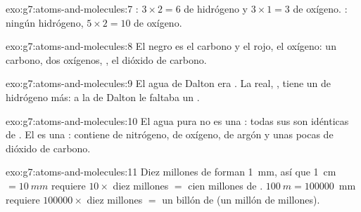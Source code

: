 \begin{solution}{exo:g7:atoms-and-molecules:7}
: $3\times 2 = 6$  de hidrógeno y $3\times 1 = 3$ 
de oxígeno. : ningún hidrógeno, $5\times 2 = 10$  de
oxígeno.
\end{solution}

\begin{solution}{exo:g7:atoms-and-molecules:8}
El negro es el carbono y el rojo, el oxígeno: un carbono, dos oxígenos,
, el dióxido de carbono.
\end{solution}

\begin{solution}{exo:g7:atoms-and-molecules:9}
El agua de Dalton era . La  real, , tiene un
 de hidrógeno más: a la  de Dalton le faltaba un .
\end{solution}

\begin{solution}{exo:g7:atoms-and-molecules:10}
El agua pura no es una : todas sus  son 
idénticas de . El  es una : contiene  de
nitrógeno,  de oxígeno,  de argón y unas pocas 
de dióxido de carbono.
\end{solution}

\begin{solution}{exo:g7:atoms-and-molecules:11}
Diez millones de  forman \qty{1}{mm}, así que
\qty{1}{cm} $= \qty{10}{mm}$ requiere $10 \times$ diez millones $=$
cien millones de . $\qty{100}{m} = \num{100000}$~mm requiere $\num{100000}\times$
diez millones $=$ un billón de  (un millón de millones).
\end{solution}

